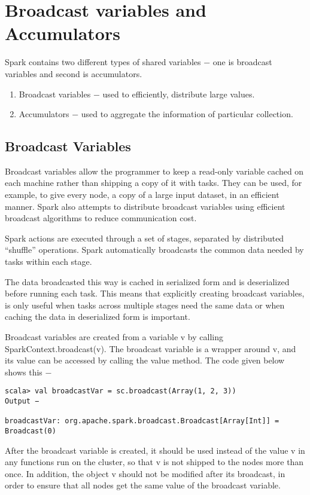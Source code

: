 \documentclass[a4paper,12pt]{article}
\begin{document}
\section*{Broadcast variables and Accumulators }
Spark contains two different types of shared variables − one is broadcast variables and second is accumulators.
\begin{enumerate}
\item Broadcast variables − used to efficiently, distribute large values.

\item Accumulators − used to aggregate the information of particular collection.
\end{enumerate}


\subsection*{Broadcast Variables}
Broadcast variables allow the programmer to keep a read-only variable cached on each machine rather than shipping a copy of it with tasks. They can be used, for example, to give every node, a copy of a large input dataset, in an efficient manner. Spark also attempts to distribute broadcast variables using efficient broadcast algorithms to reduce communication cost.

Spark actions are executed through a set of stages, separated by distributed “shuffle” operations. Spark automatically broadcasts the common data needed by tasks within each stage.

The data broadcasted this way is cached in serialized form and is deserialized before running each task. This means that explicitly creating broadcast variables, is only useful when tasks across multiple stages need the same data or when caching the data in deserialized form is important.

Broadcast variables are created from a variable v by calling SparkContext.broadcast(v). The broadcast variable is a wrapper around v, and its value can be accessed by calling the value method. The code given below shows this −
\begin{verbatim}
scala> val broadcastVar = sc.broadcast(Array(1, 2, 3))
Output −

broadcastVar: org.apache.spark.broadcast.Broadcast[Array[Int]] = Broadcast(0)
\end{verbatim}

After the broadcast variable is created, it should be used instead of the value v in any functions run on the cluster, so that v is not shipped to the nodes more than once. In addition, the object v should not be modified after its broadcast, in order to ensure that all nodes get the same value of the broadcast variable.
\end{document}
